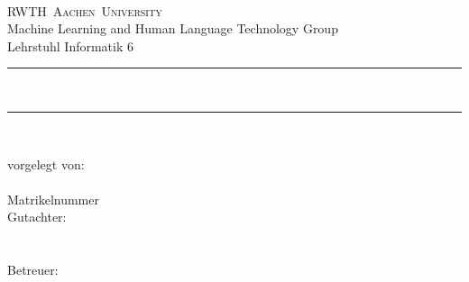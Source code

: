 \date{\publicationDate}
\thispagestyle{empty}
\begin{titlepage}
  \begin{minipage}[h]{14.5cm}
  \parindent=0pt
  \raggedleft

  \vspace{0.4cm}

  \Large
  \thesisStudyCourse\\
  \textsc{RWTH~Aachen~University}\\
  Machine Learning and Human Language Technology Group\\
  Lehrstuhl Informatik 6\\
  \vspace{0.4cm}
  \rule{\textwidth}{1mm}
  \makeatletter \Huge \center
  \textbf{\@title}\\
  \rule{\textwidth}{1mm}
  \raggedleft
  \vspace{2cm}
  \Large

  \@date\\
  \vspace{0.4cm}

  vorgelegt von: %
  \\ \studentname
  \\ Matrikelnummer \MatrikelNummer
  \\[2eX]
  Gutachter:\\ %
  \firstreviewer\\
  \secondreviewer\\
  Betreuer:\\ %
  \supervisor
  \makeatother
  \vfill\vfill
  \end{minipage}
\end{titlepage}